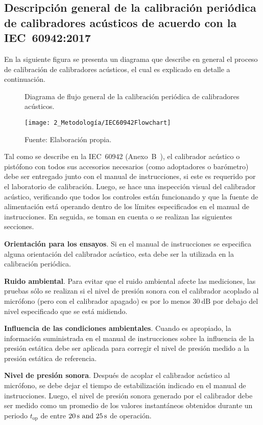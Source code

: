 \subsection{Descripción general de la calibración periódica de calibradores acústicos de acuerdo con la \mbox{IEC 60942:2017}}
\label{subsec:acoustic_calibrators_calibration_description}

En la siguiente figura se presenta un diagrama que describe en general el proceso de calibración de calibradores acústicos, el cual es explicado en detalle a continuación.
%
\begin{figure}[h]
    \caption{Diagrama de flujo general de la calibración periódica de calibradores acústicos.}
    \label{fig:acoustic_calibrator_calibration_flowchart}
    \centering
    \texttt{[image: 2\_Metodología/IEC60942Flowchart]}
    \caption*{\footnotesize Fuente: Elaboración propia.}
\end{figure}

Tal como se describe en la \mbox{IEC 60942} (\mbox{Anexo B}~\citeyear{IEC_TC29_2017}), el calibrador acústico o pistófono con todos sus accesorios necesarios (como adoptadores o barómetro) debe ser entregado junto con el manual de instrucciones, si este es requerido por el laboratorio de calibración.
Luego, se hace una inspección visual del calibrador acústico, verificando que todos los controles están funcionando y que la fuente de alimentación está operando dentro de los límites especificados en el manual de instrucciones.
En seguida, se toman en cuenta o se realizan las siguientes secciones.

\textbf{Orientación para los ensayos}.
Si en el manual de instrucciones se especifica alguna orientación del calibrador acústico, esta debe ser la utilizada en la calibración periódica.

\textbf{Ruido ambiental}.
Para evitar que el ruido ambiental afecte las mediciones, las pruebas sólo se realizan si el nivel de presión sonora con el calibrador acoplado al micrófono (pero con el calibrador apagado) es por lo menos $\qty{30}{\dB}$ por debajo del nivel especificado que se está midiendo.

\textbf{Influencia de las condiciones ambientales}.
Cuando es apropiado, la información suministrada en el manual de instrucciones sobre la influencia de la presión estática debe ser aplicada para corregir el nivel de presión medido a la presión estática de referencia.

\textbf{Nivel de presión sonora}.
Después de acoplar el calibrador acústico al micrófono, se debe dejar el tiempo de estabilización indicado en el manual de instrucciones.
Luego, el nivel de presión sonora generado por el calibrador debe ser medido como un promedio de los valores instantáneos obtenidos durante un periodo $t_{\mathrm{op}}$ de entre $\qtylist{20;25}{\s}$ de operación.

